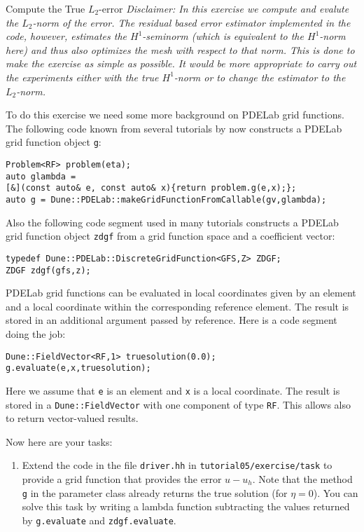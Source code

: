 \documentclass[12pt,a4paper]{article}
\begin{document}
\begin{Exercise}{Compute the True $L_2$-error}
  \textit{Disclaimer: In this exercise we compute and evalute the
    $L_2$-norm of the error. The residual based error estimator
    implemented in the code, however, estimates the $H^1$-seminorm
    (which is equivalent to the $H^1$-norm here) and thus also
    optimizes the mesh with respect to that norm.  This is done to
    make the exercise as simple as possible. It would be more
    appropriate to carry out the experiments either with the true
    $H^1$-norm or to change the estimator to the $L_2$-norm.}

  To do this exercise we need some more background on PDELab grid
  functions.  The following code known from several tutorials by now
  constructs a PDELab grid function object \lstinline{g}:
  \begin{lstlisting}[basicstyle=\ttfamily\small,
    frame=single,
    backgroundcolor=\color{listingbg}]
Problem<RF> problem(eta);
auto glambda =
[&](const auto& e, const auto& x){return problem.g(e,x);};
auto g = Dune::PDELab::makeGridFunctionFromCallable(gv,glambda);
    \end{lstlisting}
    Also the following code segment used in many tutorials constructs
    a PDELab grid function object \lstinline{zdgf} from a grid
    function space and a coefficient vector:
    \begin{lstlisting}[basicstyle=\ttfamily\small,
frame=single,
backgroundcolor=\color{listingbg}]
typedef Dune::PDELab::DiscreteGridFunction<GFS,Z> ZDGF;
ZDGF zdgf(gfs,z);
    \end{lstlisting}
    PDELab grid functions can be evaluated in local coordinates given
    by an element and a local coordinate within the corresponding
    reference element.  The result is stored in an additional argument
    passed by reference.  Here is a code segment doing the job:
    \begin{lstlisting}[basicstyle=\ttfamily\small,
frame=single,
backgroundcolor=\color{listingbg}]
Dune::FieldVector<RF,1> truesolution(0.0);
g.evaluate(e,x,truesolution);
    \end{lstlisting}
    Here we assume that \lstinline{e} is an element and \lstinline{x}
    is a local coordinate.  The result is stored in a
    \lstinline{Dune::FieldVector} with one component of type
    \lstinline{RF}. This allows also to return vector-valued results.

    Now here are your tasks:
    \begin{enumerate}
    \item Extend the code in the file \lstinline{driver.hh} in
      \lstinline{tutorial05/exercise/task} to provide a grid function
      that provides the error $u-u_h$. Note that the method
      \lstinline{g} in the parameter class already returns the true
      solution (for $\eta=0$).  You can solve this task by writing a
      lambda function subtracting the values returned by
      \lstinline{g.evaluate} and \lstinline{zdgf.evaluate}.


\end{enumerate}
\end{Exercise}
\end{document}
